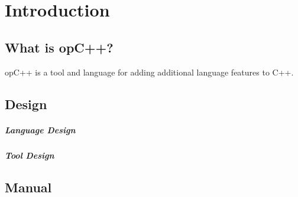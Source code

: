 
\chapter{Introduction}
\label{chap:introduction}

\section{ What is opC++? }
\label{sec:introduction_what}

opC++ is a tool and language for adding additional language features to C++.  

\section{ Design }
\label{sec:introduction_design}

\paragraph{Language Design}

\paragraph{Tool Design}


\section{ Manual }
\label{sec:introduction_manual}

